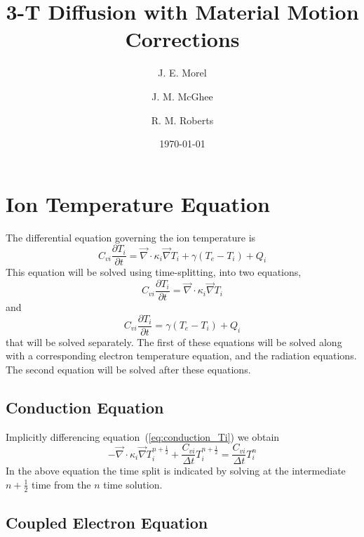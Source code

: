 \documentclass[12pt]{article}
\newcommand{\partl}[2]{\ensuremath{\frac{\partial{#1}}{\partial{#2}}}}\newcommand{\del}{\ensuremath{\vec{\nabla}}}
\begin{document}
\title{3-T Diffusion with Material Motion Corrections}
\author{J. E. Morel \and J. M. McGhee \and R. M. Roberts}
\date{\today}

\maketitle

\newpage

\section{Ion Temperature Equation}

The differential equation governing the ion temperature is
\begin{equation}
        C_{vi} \partl{T_{i}}{t} = \del \cdot \kappa_{i} \del T_{i}
                                        + \gamma (T_{e}-T_{i}) + Q_{i}
\end{equation}
This equation will be solved using time-splitting, into two equations,
\begin{equation}
        C_{vi} \partl{T_{i}}{t} = \del \cdot \kappa_{i} \del T_{i}
\label{eq:conduction_Ti}
\end{equation}
and
\begin{equation}
        C_{vi} \partl{T_{i}}{t} = \gamma (T_{e}-T_{i}) + Q_{i}
\label{eq:couple_Ti}
\end{equation}
that will be solved separately.
The first of these equations will be solved along with a corresponding
electron temperature equation, and the radiation equations.
The second equation will be solved after these equations.

\subsection{Conduction Equation}

Implicitly differencing equation~(\ref{eq:conduction_Ti})
we obtain
\begin{equation}
  \boxed{
     - \del \cdot \kappa_{i} \del T_{i}^{n+\frac{1}{2}}
     + \frac{C_{vi}}{\Delta t} T_{i}^{n+\frac{1}{2}}
           = \frac{C_{vi}}{\Delta t} T_{i}^{n}
  }
\label{eq:conduction_Ti_tdiff}  
\end{equation}
In the above equation the time split is indicated by solving at the
intermediate $n+\frac{1}{2}$ time from the $n$ time solution.

\subsection{Coupled Electron Equation}
\end{document}

